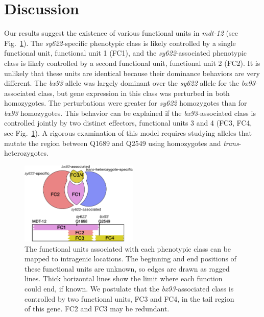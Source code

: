 \documentclass[8pt, twocolumn]{article}
\newcommand{\gene}[1]{\mbox{\emph{#1}}}
\newcommand{\dpy}{\gene{mdt-12}}
\begin{document}
\section*{Discussion}
\label{sec:conclusions}
Our results suggest the existence of various functional units in \dpy{} (see
Fig.~\ref{fig:domains}).  The \emph{sy622}-specific phenotypic class is likely
controlled by a single functional unit, functional unit 1 (FC1), and the
\emph{sy622}-associated phenotypic class is likely controlled by a second
functional unit, functional unit 2 (FC2). It is unlikely that these units are
identical because their dominance behaviors are very different. The \emph{bx93}
allele was largely dominant over the \emph{sy622} allele for the
\emph{bx93}-associated class, but gene expression in this class was perturbed in
both homozygotes. The perturbations were greater for \emph{sy622} homozygotes
than for \emph{bx93} homozygotes. This behavior can be explained if the
\emph{bx93}-associated class is controlled jointly by two distinct effectors,
functional units 3 and 4 (FC3, FC4, see Fig.~\ref{fig:domains}). A rigorous
examination of this model requires studying alleles that mutate the region
between Q1689 and Q2549 using homozygotes and \emph{trans}-heterozygotes.


\begin{figure}
  \centering{}
  \includegraphics[width=0.5\textwidth]{../../figs/inferred_domains.pdf}
  \caption{
    The functional units associated with each phenotypic class can be
    mapped to intragenic locations. The beginning and end positions of
    these functional units are unknown,
    so edges are drawn as ragged lines. Thick horizontal lines show the
    limit where each function could end, if known. We postulate that the
    \emph{bx93}-associated class is controlled by two functional units, FC3 and
    FC4, in the tail region of this gene. FC2 and FC3 may be redundant.
  }
\label{fig:domains}
\end{figure}
\end{document}
